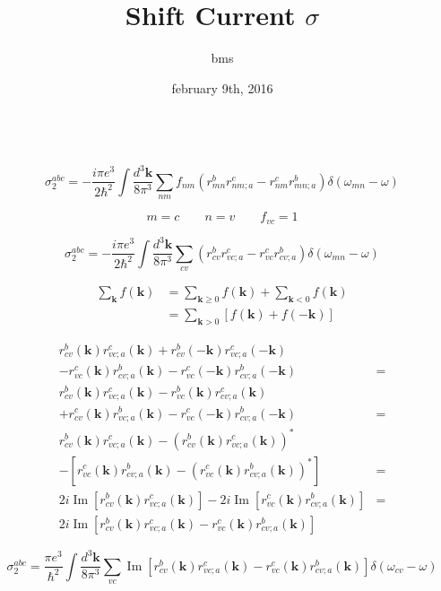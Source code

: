 \documentclass{article}
\title{Shift Current $\sigma$}
\author{bms}
\date{february 9th, 2016}
\begin{document}
\
\begin{equation*}
\sigma^{abc}_2 = - \frac{i \pi e^{3}}{2 \hbar^{2}} \int \frac{d^{3}\mathbf{k}}{8\pi^{3}}
\sum_{nm}f_{nm}(r^{b}_{mn} r^{c}_{nm;a} - r^{c}_{nm} r^{b}_{mn;a})
\delta(\omega_{mn} - \omega)
\end{equation*}

\begin{equation*}
m = c \qquad
n = v \qquad
f_{vc} = 1
\end{equation*}

\begin{equation*}
\sigma^{abc}_2 = - \frac{i \pi e^{3}}{2 \hbar^{2}} \int \frac{d^{3}\mathbf{k}}{8\pi^{3}}
\sum_{cv}(r^{b}_{cv} r^{c}_{vc;a} - r^{c}_{vc} r^{b}_{cv;a})
\delta(\omega_{mn} - \omega)
\end{equation*}

\begin{align*}
\sum_{\mathbf{k}}f(\mathbf{k}) &= \sum_{\mathbf{k}\geq 0}f(\mathbf{k}) + 
\sum_{\mathbf{k}<0}f(\mathbf{k}) \\
&= \sum_{\mathbf{k}>0} \left[f(\mathbf{k}) + f(\mathbf{-k}) \right]
\end{align*}

\begin{align*}      
  r^{b}_{cv}(\mathbf{k}) r^{c}_{vc;a}(\mathbf{k}) + 
  r^{b}_{cv}(-\mathbf{k})r^{c}_{vc;a}(-\mathbf{k}) & \\
- r^{c}_{vc}(\mathbf{k}) r^{b}_{cv;a}(\mathbf{k}) - 
  r^{c}_{vc}(-\mathbf{k})r^{b}_{cv;a}(-\mathbf{k}) & = \\
  r^{b}_{cv}(\mathbf{k}) r^{c}_{vc;a}(\mathbf{k}) - 
  r^{b}_{vc}(\mathbf{k}) r^{c}_{cv;a}(\mathbf{k}) & \\
+ r^{c}_{cv}(\mathbf{k}) r^{b}_{vc;a}(\mathbf{k}) - 
  r^{c}_{vc}(-\mathbf{k})r^{b}_{cv;a}(-\mathbf{k}) & = \\
  r^{b}_{cv}(\mathbf{k}) r^{c}_{vc;a}(\mathbf{k}) -
  (r^{b}_{cv}(\mathbf{k}) r^{c}_{vc;a}(\mathbf{k}))^{*} \\
- [r^{c}_{vc}(\mathbf{k})r^{b}_{cv;a}(\mathbf{k})
- (r^{c}_{vc}(\mathbf{k})r^{b}_{cv;a}(\mathbf{k}))^{*}] & = \\
  2i \operatorname{Im} [r^{b}_{cv}(\mathbf{k}) r^{c}_{vc;a}(\mathbf{k})] - 
  2i \operatorname{Im} [r^{c}_{vc}(\mathbf{k}) r^{b}_{cv;a}(\mathbf{k})] & = \\
  2i \operatorname{Im} [r^{b}_{cv}(\mathbf{k}) r^{c}_{vc;a}(\mathbf{k}) - 
  r^{c}_{vc}(\mathbf{k}) r^{b}_{cv;a}(\mathbf{k})]
\end{align*}        

\begin{equation*}
\sigma^{abc}_2 = \frac{\pi e^{3}}{\hbar^{2}} \int \frac{d^{3}\mathbf{k}}{8\pi^{3}}
\sum_{vc}\operatorname{Im}[r^{b}_{cv}(\mathbf{k}) r^{c}_{vc;a}(\mathbf{k}) - 
r^{c}_{vc}(\mathbf{k}) r^{b}_{cv;a}(\mathbf{k})]
\delta(\omega_{cv} - \omega)
\end{equation*}
\end{document}
